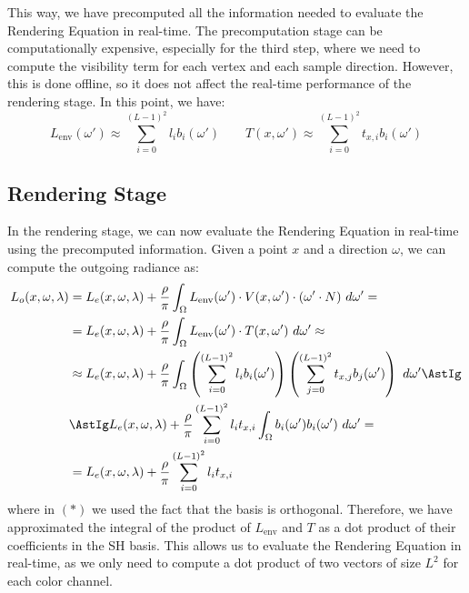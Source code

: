 This way, we have precomputed all the information needed to evaluate the Rendering Equation in real-time. The precomputation stage can be computationally expensive, especially for the third step, where we need to compute the visibility term for each vertex and each sample direction. However, this is done offline, so it does not affect the real-time performance of the rendering stage. In this point, we have:
\begin{equation*}
    L_{\text{env}}(\omega') \approx \sum_{i=0}^{(L-1)^2} l_i b_i(\omega') \qquad T(x, \omega') \approx \sum_{i=0}^{(L-1)^2} t_{x,i} b_i(\omega')
\end{equation*}

\subsection{Rendering Stage}

In the rendering stage, we can now evaluate the Rendering Equation in real-time using the precomputed information. Given a point $x$ and a direction $\omega$, we can compute the outgoing radiance as:
\begin{align*}
    L_o(x, \omega, \lambda) &= L_e(x, \omega, \lambda) + \frac{\rho}{\pi} \int_{\Omega} L_{\text{env}}(\omega')\cdot V(x, \omega') \cdot (\omega' \cdot N)\ d\omega'
    =\\&= L_e(x, \omega, \lambda) + \frac{\rho}{\pi} \int_{\Omega} L_{\text{env}}(\omega')\cdot T(x, \omega')\ d\omega'
    \approx\\&\approx L_e(x, \omega, \lambda) + \frac{\rho}{\pi} \int_{\Omega} \left( \sum_{i=0}^{(L-1)^2} l_i b_i(\omega') \right) \left( \sum_{j=0}^{(L-1)^2} t_{x,j} b_j(\omega') \right) \ d\omega'
    \AstIg\\&\AstIg L_e(x, \omega, \lambda) + \frac{\rho}{\pi} \sum_{i=0}^{(L-1)^2} l_i t_{x,i} \int_{\Omega} b_i(\omega') b_i(\omega') \ d\omega'
    = \\&= L_e(x, \omega, \lambda) + \frac{\rho}{\pi} \sum_{i=0}^{(L-1)^2} l_i t_{x,i}
\end{align*}
where in $(\ast)$ we used the fact that the basis is orthogonal. Therefore, we have approximated the integral of the product of $L_{\text{env}}$ and $T$ as a dot product of their coefficients in the SH basis. This allows us to evaluate the Rendering Equation in real-time, as we only need to compute a dot product of two vectors of size $L^2$ for each color channel.\\

